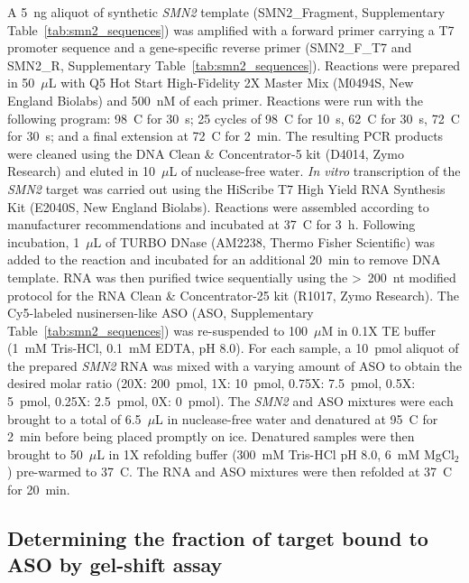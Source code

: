 \documentclass[unnumsec,webpdf,contemporary,large]{oup-authoring-template}%
\theoremstyle{thmstyleone}%
\theoremstyle{thmstyletwo}%
\theoremstyle{thmstylethree}%
\begin{document}
A 5~ng aliquot of synthetic \textit{SMN2} template (SMN2\_Fragment, Supplementary Table~\ref{tab:smn2_sequences}) was amplified with a forward primer carrying a T7 promoter sequence and a gene-specific reverse primer (SMN2\_F\_T7 and SMN2\_R, Supplementary Table~\ref{tab:smn2_sequences}). Reactions were prepared in 50~$\mu$L with Q5\textregistered{} Hot Start High-Fidelity 2X Master Mix (M0494S, New England Biolabs) and 500~nM of each primer. Reactions were run with the following program: 98~\textdegree C for 30~s; 25 cycles of 98~\textdegree C for 10~s, 62~\textdegree C for 30~s, 72~\textdegree C for 30~s; and a final extension at 72~\textdegree C for 2~min. The resulting PCR products were cleaned using the DNA Clean \& Concentrator-5 kit (D4014, Zymo Research) and eluted in 10~$\mu$L of nuclease-free water.
\textit{In vitro} transcription of the \textit{SMN2} target was carried out using the HiScribe\textregistered{} T7 High Yield RNA Synthesis Kit (E2040S, New England Biolabs). Reactions were assembled according to manufacturer recommendations and incubated at 37~\textdegree C for 3~h. Following incubation, 1~$\mu$L of TURBO DNase\texttrademark{} (AM2238, Thermo Fisher Scientific) was added to the reaction and incubated for an additional 20~min to remove DNA template. RNA was then purified twice sequentially using the \textgreater~200~nt modified protocol for the RNA Clean \& Concentrator-25 kit (R1017, Zymo Research).
The Cy5-labeled nusinersen-like ASO (ASO, Supplementary Table~\ref{tab:smn2_sequences}) was re-suspended to 100~$\mu$M in 0.1X TE buffer (1~mM Tris-HCl, 0.1~mM EDTA, pH 8.0). For each sample, a 10~pmol aliquot of the prepared \textit{SMN2} RNA was mixed with a varying amount of ASO to obtain the desired molar ratio (20X: 200~pmol, 1X: 10~pmol, 0.75X: 7.5~pmol, 0.5X: 5~pmol, 0.25X: 2.5~pmol, 0X: 0~pmol). The \textit{SMN2} and ASO mixtures were each brought to a total of 6.5~$\mu$L in nuclease-free water and denatured at 95~\textdegree C for 2~min before being placed promptly on ice. Denatured samples were then brought to 50~$\mu$L in 1X refolding buffer (300~mM Tris-HCl pH 8.0, 6~mM MgCl$_2$) pre-warmed to 37~\textdegree C. The RNA and ASO mixtures were then refolded at 37~\textdegree C for 20~min.

\subsection{Determining the fraction of target bound to ASO by gel-shift assay}
\end{document}
